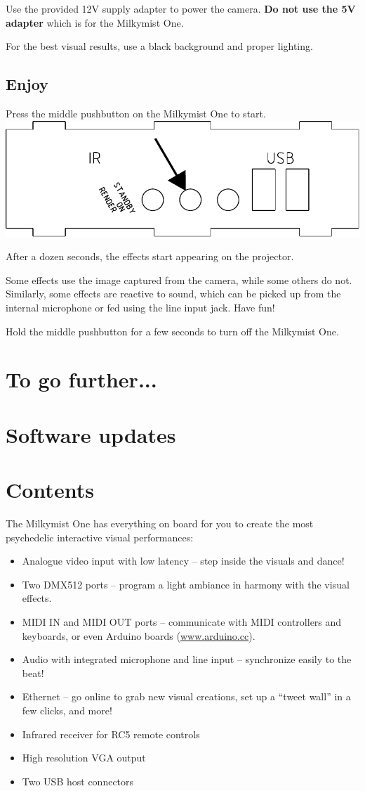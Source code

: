 \documentclass{leaflet}
\begin{document}
Use the provided 12V supply adapter to power the camera. \textbf{Do not use the 5V adapter} which is for the Milkymist One.

For the best visual results, use a black background and proper lighting.

\subsection{Enjoy}
Press the middle pushbutton on the Milkymist One to start.
\includegraphics[width=\textwidth]{midpb.pdf}

After a dozen seconds, the effects start appearing on the projector.

Some effects use the image captured from the camera, while some others do not. Similarly, some effects are reactive to sound, which can be picked up from the internal microphone or fed using the line input jack. Have fun!

Hold the middle pushbutton for a few seconds to turn off the Milkymist One.

\section{To go further...}

\section{Software updates}

\section{Contents}
The Milkymist One has everything on board for you to create the most psychedelic interactive visual performances:
\begin{itemize}
\item Analogue video input with low latency -- step inside the visuals and dance!
\item Two DMX512 ports -- program a light ambiance in harmony with the visual effects.
\item MIDI IN and MIDI OUT ports -- communicate with MIDI controllers and keyboards, or even Arduino boards (\url{www.arduino.cc}).
\item Audio with integrated microphone and line input -- synchronize easily to the beat!
\item Ethernet -- go online to grab new visual creations, set up a ``tweet wall'' in a few clicks, and more!
\item Infrared receiver for RC5 remote controls
\item High resolution VGA output
\item Two USB host connectors
\end{itemize}
\end{document}
